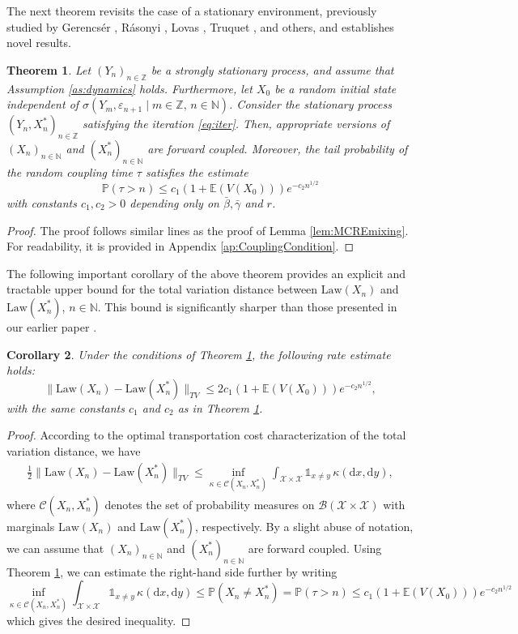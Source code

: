 \documentclass[a4paper,10pt]{article}
\newtheorem{theorem}{Theorem}[section]
\newtheorem{corollary}[theorem]{Corollary}
\newcommand{\N}{\mathbb{N}}
\newcommand{\Z}{\mathbb{Z}}
\newcommand{\B}{\mathcal{B}}
\newcommand{\X}{\mathcal{X}}
\renewcommand{\P}{\mathbb{P}}
\newcommand{\E}{\mathbb{E}}
\newcommand{\law}[1]{\text{Law}(#1)}
\newcommand{\ind}{\mathds{1}}
\newcommand{\eps}{\varepsilon}
\newcommand{\ga}{\gamma}
\newcommand{\dint}{\mathrm{d}}  %
\begin{document}
The next theorem revisits the case of a stationary environment, previously studied by Gerencsér \cite{gerencser2022invariant}, Rásonyi \cite{rasonyi2018}, Lovas \cite{lovas}, Truquet \cite{Truquet1}, and others, and establishes novel results.
\begin{theorem}\label{thm:stac_forward_coupling}
Let $(Y_n)_{n\in\Z}$ be a strongly stationary process, and assume that Assumption \ref{as:dynamics} holds. Furthermore, let $X_0$ be a random initial state independent of $\sigma (Y_m,\eps_{n+1}\mid m\in\Z,\,n\in\N)$. Consider the stationary process $(Y_n,X_n^\ast)_{n\in\Z}$ satisfying the iteration \eqref{eq:iter}.
Then, appropriate versions of $(X_n)_{n\in\N}$ and $(X_n^\ast)_{n\in\N}$ are forward coupled. Moreover, the tail probability of the random coupling time $\tau$ satisfies the estimate
$$
\P (\tau> n)\le c_1\left(1+\E(V(X_0))\right)e^{-c_2n^{1/2}}
$$
with constants $c_1,c_2>0$ depending only on $\bar{\beta},\bar{\ga}$ and $r$.
\end{theorem}
\begin{proof}
	The proof follows similar lines as the proof of Lemma \ref{lem:MCREmixing}. For readability, it is provided in Appendix \ref{ap:CouplingCondition}.
\end{proof}

The following important corollary of the above theorem provides an explicit and tractable upper bound for the total variation distance between $\law{X_n}$ and $\law{X_n^\ast}$, $n\in\N$. This bound is significantly sharper than those presented in our earlier paper \cite{lovas}.
\begin{corollary}\label{cor_fwd_dtv}
	Under the conditions of Theorem \ref{thm:stac_forward_coupling}, the following rate estimate holds:
	$$
	\lVert\law{X_n}-\law{X_n^\ast}\rVert_{TV}
	\le
	2 c_1\left(1+\E(V(X_0))\right)e^{-c_2n^{1/2}},
	$$
	with the same constants $c_1$ and $c_2$ as in Theorem \ref{thm:stac_forward_coupling}.
\end{corollary}
\begin{proof}
According to the optimal transportation cost characterization of the total variation distance, we have
\begin{align*}
	\frac{1}{2}\lVert\law{X_n}-\law{X_n^\ast}\rVert_{TV}
	\le
	\inf_{\kappa\in\mathcal{C}(X_n,X_n^\ast)}
	\int_{\X\times\X}\ind_{x\ne y}\,\kappa (\dint x, \dint y),
\end{align*}
where $\mathcal{C}(X_n,X_n^\ast)$ denotes the set of probability measures on $\B(\X\times\X)$ with marginals $\law{X_n}$ and $\law{X_n^\ast}$, respectively. By a slight abuse of notation, we can assume that $(X_n)_{n\in\N}$ and $(X_n^\ast)_{n\in\N}$ are forward coupled. Using Theorem \ref{thm:stac_forward_coupling}, we can estimate the right-hand side further by writing
\begin{equation*}
	\inf_{\kappa\in\mathcal{C}(X_n,X_n^\ast)}
	\int_{\X\times\X}\ind_{x\ne y}\,\kappa (\dint x, \dint y)
	\le \P (X_n\ne X_n^\ast) = \P (\tau>n)
	\le c_1\left(1+\E(V(X_0))\right)e^{-c_2n^{1/2}}
\end{equation*}
which gives the desired inequality.
\end{proof}
\end{document}
